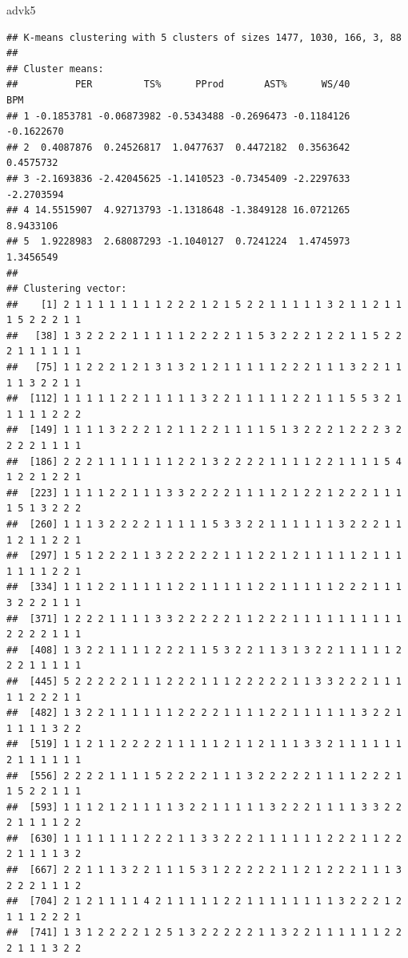 \documentclass[
]{book}
\newenvironment{Shaded}{\begin{snugshade}}{\end{snugshade}}
\newcommand{\NormalTok}[1]{#1}
\begin{document}
\begin{Shaded}
\begin{Highlighting}[]
\NormalTok{advk5}
\end{Highlighting}
\end{Shaded}

\begin{verbatim}
## K-means clustering with 5 clusters of sizes 1477, 1030, 166, 3, 88
## 
## Cluster means:
##          PER         TS%      PProd       AST%      WS/40        BPM
## 1 -0.1853781 -0.06873982 -0.5343488 -0.2696473 -0.1184126 -0.1622670
## 2  0.4087876  0.24526817  1.0477637  0.4472182  0.3563642  0.4575732
## 3 -2.1693836 -2.42045625 -1.1410523 -0.7345409 -2.2297633 -2.2703594
## 4 14.5515907  4.92713793 -1.1318648 -1.3849128 16.0721265  8.9433106
## 5  1.9228983  2.68087293 -1.1040127  0.7241224  1.4745973  1.3456549
## 
## Clustering vector:
##    [1] 2 1 1 1 1 1 1 1 1 2 2 2 1 2 1 5 2 2 1 1 1 1 1 3 2 1 1 2 1 1 1 5 2 2 2 1 1
##   [38] 1 3 2 2 2 2 1 1 1 1 1 2 2 2 2 1 1 5 3 2 2 2 1 2 2 1 1 5 2 2 2 1 1 1 1 1 1
##   [75] 1 1 2 2 2 1 2 1 3 1 3 2 1 2 1 1 1 1 1 2 2 2 1 1 1 3 2 2 1 1 1 1 3 2 2 1 1
##  [112] 1 1 1 1 1 2 2 1 1 1 1 1 3 2 2 1 1 1 1 1 2 2 1 1 1 5 5 3 2 1 1 1 1 1 2 2 2
##  [149] 1 1 1 1 3 2 2 2 1 2 1 1 2 2 1 1 1 1 5 1 3 2 2 2 1 2 2 2 3 2 2 2 2 1 1 1 1
##  [186] 2 2 2 1 1 1 1 1 1 1 2 2 1 3 2 2 2 2 1 1 1 1 2 2 1 1 1 1 5 4 1 2 2 1 2 2 1
##  [223] 1 1 1 1 2 2 1 1 1 3 3 2 2 2 2 1 1 1 1 2 1 2 2 1 2 2 2 1 1 1 1 5 1 3 2 2 2
##  [260] 1 1 1 3 2 2 2 2 1 1 1 1 1 5 3 3 2 2 1 1 1 1 1 1 3 2 2 2 1 1 1 2 1 1 2 2 1
##  [297] 1 5 1 2 2 2 1 1 3 2 2 2 2 2 1 1 1 2 2 1 2 1 1 1 1 1 2 1 1 1 1 1 1 1 2 2 1
##  [334] 1 1 1 2 2 1 1 1 1 1 2 2 1 1 1 1 1 2 2 1 1 1 1 1 2 2 2 1 1 1 3 2 2 2 1 1 1
##  [371] 1 2 2 2 1 1 1 1 3 3 2 2 2 2 2 1 1 2 2 2 1 1 1 1 1 1 1 1 1 1 2 2 2 2 1 1 1
##  [408] 1 3 2 2 1 1 1 1 2 2 2 1 1 5 3 2 2 1 1 3 1 3 2 2 1 1 1 1 1 2 2 2 1 1 1 1 1
##  [445] 5 2 2 2 2 2 1 1 1 2 2 2 1 1 1 2 2 2 2 2 1 1 3 3 2 2 2 1 1 1 1 1 2 2 2 1 1
##  [482] 1 3 2 2 1 1 1 1 1 1 2 2 2 2 1 1 1 1 2 2 1 1 1 1 1 1 3 2 2 1 1 1 1 1 3 2 2
##  [519] 1 1 2 1 1 2 2 2 2 1 1 1 1 1 2 1 1 2 1 1 1 3 3 2 1 1 1 1 1 1 2 1 1 1 1 1 1
##  [556] 2 2 2 2 1 1 1 1 5 2 2 2 2 1 1 1 3 2 2 2 2 2 1 1 1 1 2 2 2 1 1 5 2 2 1 1 1
##  [593] 1 1 1 2 1 2 1 1 1 1 3 2 2 1 1 1 1 1 3 2 2 2 1 1 1 1 3 3 2 2 2 1 1 1 1 2 2
##  [630] 1 1 1 1 1 1 1 2 2 2 1 1 3 3 2 2 2 1 1 1 1 1 1 2 2 2 1 1 2 2 2 1 1 1 1 3 2
##  [667] 2 2 1 1 1 3 2 2 1 1 1 5 3 1 2 2 2 2 2 1 1 2 1 2 2 2 1 1 1 3 2 2 2 1 1 1 2
##  [704] 2 1 2 1 1 1 1 4 2 1 1 1 1 1 2 2 1 1 1 1 1 1 1 1 3 2 2 2 1 2 1 1 1 2 2 2 1
##  [741] 1 3 1 2 2 2 2 1 2 5 1 3 2 2 2 2 2 1 1 3 2 2 1 1 1 1 1 1 2 2 2 1 1 1 3 2 2

\end{verbatim}
\end{document}
